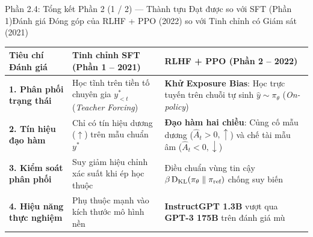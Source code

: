 \begin{frame}{Phần 2.4: Tổng kết Phần 2 (1 / 2) --- Thành tựu Đạt được so với SFT (Phần 1)}{Đánh giá Đóng góp của RLHF + PPO (2022) so với Tinh chỉnh có Giám sát (2021)}
  \vspace{0.05cm}
  \footnotesize
  \renewcommand{\arraystretch}{1.32}
  \begin{tabularx}{\textwidth}{@{}p{3.4cm} X X@{}}
    \toprule
    \textbf{Tiêu chí Đánh giá} & \textbf{Tinh chỉnh SFT (Phần 1 -- 2021)} & \textbf{RLHF + PPO (Phần 2 -- 2022)} \\
    \midrule
    \textbf{1. Phân phối trạng thái} & Học tĩnh trên tiền tố chuyên gia $y_{<t}^*$ (\textit{Teacher Forcing}) & \textbf{\textcolor{tealgreen}{Khử Exposure Bias}}: Học trực tuyến trên chuỗi tự sinh $\hat{y} \sim \pi_\theta$ (\textit{On-policy}) \\
    \hline
    \textbf{2. Tín hiệu đạo hàm} & Chỉ có tín hiệu dương ($\uparrow$) trên mẫu chuẩn $y^*$ & \textbf{\textcolor{tealgreen}{Đạo hàm hai chiều}}: Củng cố mẫu dương ($\hat{A}_t > 0, \uparrow$) và chế tài mẫu âm ($\hat{A}_t < 0, \downarrow$) \\
    \hline
    \textbf{3. Kiểm soát phân phối} & Suy giảm hiệu chỉnh xác suất khi ép học thuộc & Điều chuẩn vùng tin cậy $\beta\operatorname{D_{\mathrm{KL}}}(\pi_\theta \parallel \pi_{\text{ref}})$ chống suy biến \\
    \hline
    \textbf{4. Hiệu năng thực nghiệm} & Phụ thuộc mạnh vào kích thước mô hình nền & \textbf{InstructGPT 1.3B} vượt qua \textbf{GPT-3 175B} trên đánh giá mù \\
    \bottomrule
  \end{tabularx}
\end{frame}


